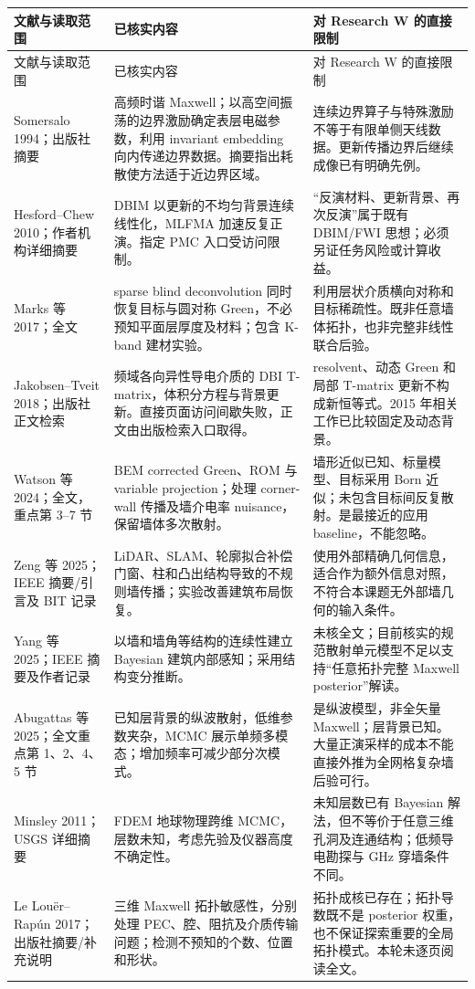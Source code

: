 \begingroup
\small
\setlength{\tabcolsep}{4pt}
\begin{longtable}{p{2.45cm}p{6.05cm}p{5.5cm}}
\hline
文献与读取范围 & 已核实内容 & 对 Research W 的直接限制 \\
\hline
\endfirsthead
\hline
文献与读取范围 & 已核实内容 & 对 Research W 的直接限制 \\
\hline
\endhead
Somersalo 1994\cite{L_Somersalo}；出版社摘要 & 高频时谐 Maxwell；以高空间振荡的边界激励确定表层电磁参数，利用 invariant embedding 向内传递边界数据。摘要指出耗散使方法适于近边界区域。 & 连续边界算子与特殊激励不等于有限单侧天线数据。更新传播边界后继续成像已有明确先例。 \\
\hline
Hesford--Chew 2010\cite{L_DBIM}；作者机构详细摘要 & DBIM 以更新的不均匀背景连续线性化，MLFMA 加速反复正演。指定 PMC 入口受访问限制。 & “反演材料、更新背景、再次反演”属于既有 DBIM/FWI 思想；必须另证任务风险或计算收益。 \\
\hline
Marks 等 2017\cite{L_Marks}；全文 & sparse blind deconvolution 同时恢复目标与圆对称 Green，不必预知平面层厚度及材料；包含 K-band 建材实验。 & 利用层状介质横向对称和目标稀疏性。既非任意墙体拓扑，也非完整非线性联合后验。 \\
\hline
Jakobsen--Tveit 2018\cite{L_Tmatrix}；出版社正文检索 & 频域各向异性导电介质的 DBI T-matrix，体积分方程与背景更新。直接页面访问间歇失败，正文由出版检索入口取得。 & resolvent、动态 Green 和局部 T-matrix 更新不构成新恒等式。2015 年相关工作已比较固定及动态背景\cite{L_Tmatrix15}。 \\
\hline
Watson 等 2024\cite{L_Watson}；全文，重点第 3--7 节 & BEM corrected Green、ROM 与 variable projection；处理 corner-wall 传播及墙介电率 nuisance，保留墙体多次散射。 & 墙形近似已知、标量模型、目标采用 Born 近似；未包含目标间反复散射。是最接近的应用 baseline，不能忽略。 \\
\hline
Zeng 等 2025\cite{L_Lidar}；IEEE 摘要/引言及 BIT 记录 & LiDAR、SLAM、轮廓拟合补偿门窗、柱和凸出结构导致的不规则墙传播；实验改善建筑布局恢复。 & 使用外部精确几何信息，适合作为额外信息对照，不符合本课题无外部墙几何的输入条件。 \\
\hline
Yang 等 2025\cite{L_Building}；IEEE 摘要及作者记录 & 以墙和墙角等结构的连续性建立 Bayesian 建筑内部感知；采用结构变分推断。 & 未核全文；目前核实的规范散射单元模型不足以支持“任意拓扑完整 Maxwell posterior”解读。 \\
\hline
Abugattas 等 2025\cite{L_LayerUQ}；全文重点第 1、2、4、5 节 & 已知层背景的纵波散射，低维参数夹杂，MCMC 展示单频多模态；增加频率可减少部分次模式。 & 是纵波模型，非全矢量 Maxwell；层背景已知。大量正演采样的成本不能直接外推为全网格复杂墙后验可行。 \\
\hline
Minsley 2011\cite{L_Minsley}；USGS 详细摘要 & FDEM 地球物理跨维 MCMC，层数未知，考虑先验及仪器高度不确定性。 & 未知层数已有 Bayesian 解法，但不等价于任意三维孔洞及连通结构；低频导电勘探与 GHz 穿墙条件不同。 \\
\hline
Le Louër--Rapún 2017\cite{L_Topology}；出版社摘要/补充说明 & 三维 Maxwell 拓扑敏感性，分别处理 PEC、腔、阻抗及介质传输问题；检测不预知的个数、位置和形状。 & 拓扑成核已存在；拓扑导数既不是 posterior 权重，也不保证探索重要的全局拓扑模式。本轮未逐页阅读全文。 \\
\hline
\end{longtable}
\endgroup

